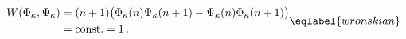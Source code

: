 \begin{equation}
\begin{split}
W(\Phi_\kappa,\Psi_\kappa) &= (n+1)\bigl(\Phi_\kappa(n) \Psi_\kappa(n+1) - 
\Psi_\kappa(n)\Phi_\kappa(n+1)\bigr) \\
&= {\rm const.} = 1 \,.
\end{split}
\eqlabel{wronskian}
\end{equation}

